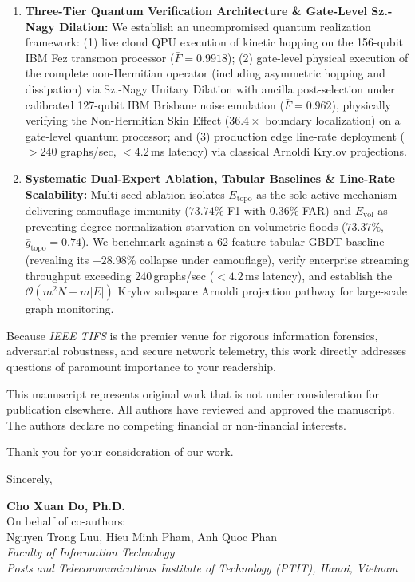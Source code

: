 \documentclass[10pt,a4paper]{article}
\begin{document}
\begin{enumerate}
    \item \textbf{Three-Tier Quantum Verification Architecture \& Gate-Level Sz.-Nagy Dilation:} We establish an uncompromised quantum realization framework: (1) live cloud QPU execution of kinetic hopping on the 156-qubit IBM Fez transmon processor ($\bar{F} = 0.9918$); (2) gate-level physical execution of the complete non-Hermitian operator (including asymmetric hopping and dissipation) via Sz.-Nagy Unitary Dilation with ancilla post-selection under calibrated 127-qubit IBM Brisbane noise emulation ($\bar{F} = 0.962$), physically verifying the Non-Hermitian Skin Effect ($36.4\times$ boundary localization) on a gate-level quantum processor; and (3) production edge line-rate deployment ($>240$ graphs/sec, $<4.2$\,ms latency) via classical Arnoldi Krylov projections.
    \item \textbf{Systematic Dual-Expert Ablation, Tabular Baselines \& Line-Rate Scalability:} Multi-seed ablation isolates $E_{\text{topo}}$ as the sole active mechanism delivering camouflage immunity ($73.74\%$ F1 with $0.36\%$ FAR) and $E_{\text{vol}}$ as preventing degree-normalization starvation on volumetric floods ($73.37\%$, $\bar{g}_{\text{topo}}=0.74$). We benchmark against a 62-feature tabular GBDT baseline (revealing its $-28.98\%$ collapse under camouflage), verify enterprise streaming throughput exceeding $240$\,graphs/sec ($<4.2$\,ms latency), and establish the $\mathcal{O}(m^2 N + m |E|)$ Krylov subspace Arnoldi projection pathway for large-scale graph monitoring.
\end{enumerate}

Because \textit{IEEE TIFS} is the premier venue for rigorous information forensics, adversarial robustness, and secure network telemetry, this work directly addresses questions of paramount importance to your readership.

This manuscript represents original work that is not under consideration for publication elsewhere. All authors have reviewed and approved the manuscript. The authors declare no competing financial or non-financial interests.

Thank you for your consideration of our work.

\vspace{1.5em}
Sincerely,

\textbf{Cho Xuan Do, Ph.D.} \\
On behalf of co-authors: \\
Nguyen Trong Luu, Hieu Minh Pham, Anh Quoc Phan \\
\textit{Faculty of Information Technology} \\
\textit{Posts and Telecommunications Institute of Technology (PTIT), Hanoi, Vietnam}
\end{document}
